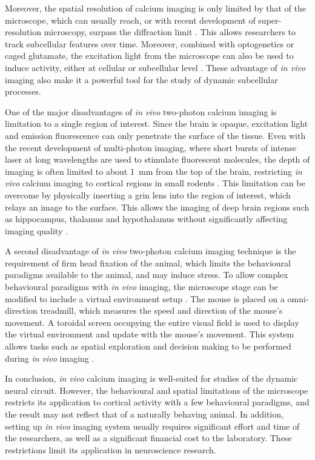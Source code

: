 Moreover, the spatial resolution of calcium imaging is only limited by that of the microscope, which can usually reach, or with recent development of super-resolution microscopy, surpass the diffraction limit \citep{dudok15}. This allows researchers to track subcellular features over time. Moreover, combined with optogenetics or caged glutamate, the excitation light from the microscope can also be used to induce activity, either at cellular or subcellular level \citep{kantevari10, noguchi11, prakash12}. These advantage of \textit{in vivo} imaging also make it a powerful tool for the study of dynamic subcellular processes. 

One of the major disadvantages of \textit{in vivo} two-photon calcium imaging is limitation to a single region of interest. Since the brain is opaque, excitation light and emission fluorescence can only penetrate the surface of the tissue. Even with the recent development of multi-photon imaging, where short bursts of intense laser at long wavelengths are used to stimulate fluorescent molecules, the depth of imaging is often limited to about \SI{1}{\mm} from the top of the brain, restricting \textit{in vivo} calcium imaging to cortical regions in small rodents \citep{horton13, yang17}. This limitation can be overcome by physically inserting a \gls{grin} lens into the region of interest, which relays an image to the surface. This allows the imaging of deep brain regions such as hippocampus, thalamus and hypothalamus without significantly affecting imaging quality \citep{attardo15}.

A second disadvantage of \textit{in vivo} two-photon calcium imaging technique is the requirement of firm head fixation of the animal, which limits the behavioural paradigms available to the animal, and may induce stress. To allow complex behavioural paradigms with \textit{in vivo} imaging, the microscope stage can be modified to include a virtual environment setup \citep{harvey09}. The mouse is placed on a omni-direction treadmill, which measures the speed and direction of the mouse's movement. A toroidal screen occupying the entire visual field is used to display the virtual environment and update with the mouse's movement. This system allows tasks such as spatial exploration and decision making to be performed during \textit{in vivo} imaging \citep{harvey09, harvey12}. 

In conclusion, \textit{in vivo} calcium imaging is well-suited for studies of the dynamic neural circuit. However, the behavioural and spatial limitations of the microscope restricts its application to cortical activity with a few behavioural paradigms, and the result may not reflect that of a naturally behaving animal. In addition, setting up \textit{in vivo} imaging system usually requires significant effort and time of the researchers, as well as a significant financial cost to the laboratory. These restrictions limit its application in neuroscience research. 

